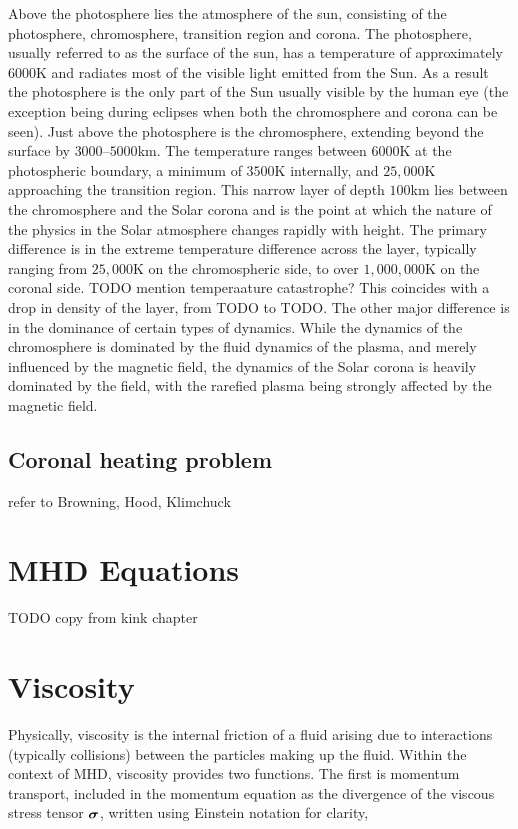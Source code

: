 Above the photosphere lies the atmosphere of the sun, consisting of the photosphere, chromosphere, transition region and corona. The photosphere, usually referred to as the surface of the sun, has a temperature of approximately $6000$K and radiates most of the visible light emitted from the Sun. As a result the photosphere is the only part of the Sun usually visible by the human eye (the exception being during eclipses when both the chromosphere and corona can be seen). Just above the photosphere is the chromosphere, extending beyond the surface by $3000$--$5000$km. The temperature ranges between $6000$K at the photospheric boundary, a minimum of $3500$K internally, and $25,000$K approaching the transition region. This narrow layer of depth $100$km lies between the chromosphere and the Solar corona and is the point at which the nature of the physics in the Solar atmosphere changes rapidly with height. The primary difference is in the extreme temperature difference across the layer, typically ranging from $25,000$K on the chromospheric side, to over $1,000,000$K on the coronal side. TODO mention temperaature catastrophe? This coincides with a drop in density of the layer, from TODO to TODO. The other major difference is in the dominance of certain types of dynamics. While the dynamics of the chromosphere is dominated by the fluid dynamics of the plasma, and merely influenced by the magnetic field, the dynamics of the Solar corona is heavily dominated by the field, with the rarefied plasma being strongly affected by the magnetic field.

\subsection{Coronal heating problem}

refer to Browning, Hood, Klimchuck

\section{MHD Equations}

TODO copy from kink chapter

\section{Viscosity}

Physically, viscosity is the internal friction of a fluid arising due to interactions (typically collisions) between the particles making up the fluid. Within the context of MHD, viscosity provides two functions. The first is momentum transport, included in the momentum equation as the divergence of the viscous stress tensor ${\bm \sigma}$, written using Einstein notation for clarity,

